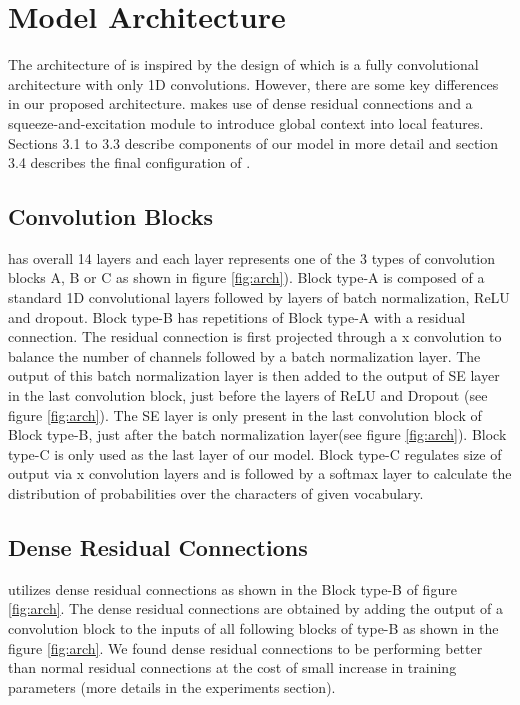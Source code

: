 \documentclass{article}
\begin{document}
\section{Model Architecture}
\label{sec:headings}
The architecture of  is inspired by the design of \cite{Chaudhary2021EASTER} which is a fully convolutional architecture with only 1D convolutions. However, there are some key differences in our proposed  architecture.  makes use of dense residual connections and a squeeze-and-excitation module to introduce global context into local features. Sections 3.1 to 3.3 describe components of our model in more detail and section 3.4 describes the final configuration of .

\subsection{Convolution Blocks}
 has overall 14 layers and each layer represents one of the 3 types of convolution blocks A, B or C as shown in figure \ref{fig:arch}). Block type-A is composed of a standard 1D convolutional layers followed by layers of batch normalization, ReLU and dropout. Block type-B has  repetitions of Block type-A with a residual connection. The residual connection is first projected through a  x  convolution to balance the number of channels followed by a batch normalization layer. The output of this batch normalization layer is then added to the output of SE layer in the last convolution block, just before the layers of ReLU and Dropout (see figure  \ref{fig:arch}). The SE layer is only present in the last convolution block of Block type-B, just after the batch normalization layer(see figure \ref{fig:arch}). Block type-C is only used as the last layer of our model. Block type-C regulates size of output via x convolution layers and is followed by a softmax layer to calculate the distribution of probabilities over the characters of given vocabulary.

\subsection{Dense Residual Connections}
 utilizes dense residual connections as shown in the Block type-B of figure \ref{fig:arch}. The dense residual connections\cite{li2019jasper} are obtained by adding the output of a convolution block to the inputs of all following blocks of type-B as shown in the figure \ref{fig:arch}. We found dense residual connections to be performing better than normal residual connections at the cost of small increase in training parameters (more details in the experiments section).
\end{document}
